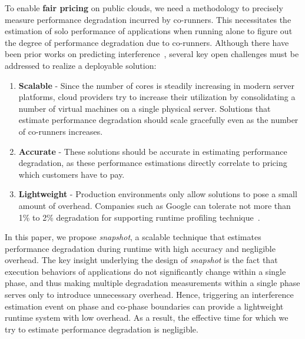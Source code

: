 \documentclass{sig-alternate}
\begin{document}
To enable \textbf{fair pricing} on public clouds, we need a methodology to precisely measure performance degradation incurred by co-runners. This necessitates the estimation of solo performance of applications when running alone to figure out the degree of performance degradation due to co-runners. Although there have been prior works on predicting interference~\cite{fairpricing, 6844481, Tang:2013:RRS:2451116.2451126, bubbleflux}, several key open challenges must be addressed to realize a deployable solution:

\begin{enumerate}
\item \textbf{Scalable} - Since the number of cores is steadily increasing in modern server platforms, cloud providers try to increase their utilization by consolidating a number of virtual machines on a single physical server. Solutions that estimate performance degradation should scale gracefully even as the number of co-runners increases.

\item \textbf{Accurate} - These solutions should be accurate in estimating performance degradation, as these performance estimations directly correlate to pricing which customers have to pay.

\item \textbf{Lightweight} - Production environments only allow solutions to pose a small amount of overhead. Companies such as Google can tolerate not more than 1\% to 2\% degradation for supporting runtime profiling technique~\cite{overheadgoogle}.
\end{enumerate}

In this paper, we propose \textit{snapshot}, a scalable technique that estimates performance degradation during runtime with high accuracy and negligible overhead. The key insight underlying the design of \textit{snapshot} is the fact that execution behaviors of applications do not significantly change within a single phase, and thus making multiple degradation measurements within a single phase serves only to introduce unnecessary overhead. Hence, triggering an interference estimation event on phase and co-phase boundaries can provide a lightweight runtime system with low overhead. As a result, the effective time for which we try to estimate performance degradation is negligible. 
\end{document}
